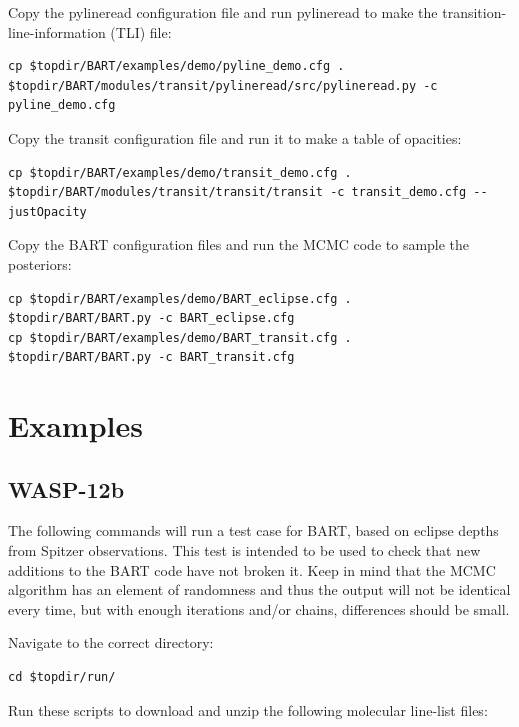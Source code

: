 \documentclass[letterpaper, 12pt]{article}
\begin{document}
\noindent Copy the pylineread configuration file and run pylineread to
make the transition-line-information (TLI) file:

{\fontsize{9.8}{1em}\selectfont
\begin{verbatim}
cp $topdir/BART/examples/demo/pyline_demo.cfg .  
$topdir/BART/modules/transit/pylineread/src/pylineread.py -c pyline_demo.cfg
\end{verbatim}}

\noindent Copy the transit configuration file and run it to make a
table of opacities:

{\fontsize{9.8}{1em}\selectfont
\begin{verbatim}
cp $topdir/BART/examples/demo/transit_demo.cfg .
$topdir/BART/modules/transit/transit/transit -c transit_demo.cfg --justOpacity
\end{verbatim}}

\noindent Copy the BART configuration files and run the MCMC code to sample the
posteriors:

{\fontsize{9.8}{1em}\selectfont
\begin{verbatim}
cp $topdir/BART/examples/demo/BART_eclipse.cfg .
$topdir/BART/BART.py -c BART_eclipse.cfg
cp $topdir/BART/examples/demo/BART_transit.cfg .
$topdir/BART/BART.py -c BART_transit.cfg
\end{verbatim}}

\section{Examples}
\subsection{WASP-12b}
The following commands will run a test case for BART, based on eclipse
depths from Spitzer observations. This test is intended to be used to
check that new additions to the BART code have not broken it. Keep in
mind that the MCMC algorithm has an element of randomness and thus the
output will not be identical every time, but with enough iterations
and/or chains, differences should be small.
\newline

\noindent Navigate to the correct directory:
{\fontsize{9.8}{1em}\selectfont
\begin{verbatim}
cd $topdir/run/
\end{verbatim}}

\noindent Run these scripts to download and unzip the following
molecular line-list files:
\end{document}

